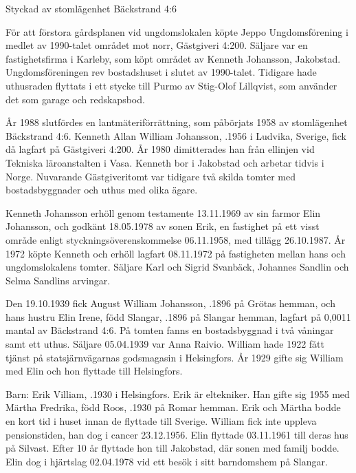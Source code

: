 Styckad av stomlägenhet Bäckstrand 4:6


%
För att förstora gårdsplanen vid ungdomslokalen köpte Jeppo	Ungdomsförening i medlet av 1990-talet området mot norr,	Gästgiveri 4:200. Säljare var en fastighetsfirma i Karleby, som köpt området av Kenneth Johansson, Jakobstad. Ungdomsföreningen	rev bostadshuset i slutet av 1990-talet. Tidigare hade uthusraden	flyttats i ett stycke till Purmo av Stig-Olof Lillqvist, som använder det som garage och redskapsbod.


%
År 1988 slutfördes en lantmäteriförrättning, som påbörjats 1958	av stomlägenhet Bäckstrand 4:6. Kenneth Allan William Johansson,	.1956 i Ludvika, Sverige, fick då lagfart på Gästgiveri 4:200.	År 1980 dimitterades han från ellinjen vid Tekniska läroanstalten i Vasa.	Kenneth bor i Jakobstad och arbetar tidvis i Norge. Nuvarande Gästgiveritomt var tidigare två skilda tomter med	bostadsbyggnader och uthus med olika ägare.

Kenneth Johansson erhöll genom testamente 13.11.1969 av sin farmor Elin Johansson, och godkänt 18.05.1978 av sonen Erik, en fastighet på ett visst område enligt styckningsöverenskommelse 06.11.1958, med tillägg 26.10.1987. År 1972 köpte Kenneth och erhöll lagfart 08.11.1972 på fastigheten mellan hans och ungdomslokalens tomter. Säljare Karl och Sigrid Svanbäck, Johannes Sandlin och Selma Sandlins arvingar.


%
Den 19.10.1939 fick August William Johansson, .1896 på	Grötas hemman, och hans hustru Elin Irene, född Slangar, .1896	på Slangar hemman, lagfart på 0,0011 mantal av Bäckstrand 4:6. På tomten fanns en bostadsbyggnad i två våningar samt ett uthus. Säljare 05.04.1939 var Anna Raivio. William hade 1922 fått tjänst på 	statsjärnvägarnas godsmagasin i Helsingfors. År 1929 gifte sig William med Elin och hon flyttade till Helsingfors.

Barn: Erik Villiam, .1930 i Helsingfors. Erik är eltekniker. Han gifte sig 1955 med 	Märtha Fredrika, född Roos, .1930 på Romar hemman. Erik och Märtha bodde en kort tid i huset innan de flyttade till Sverige. William fick inte uppleva pensionstiden, han dog i cancer 23.12.1956. Elin flyttade 03.11.1961 till deras hus på Silvast. Efter 10 år flyttade hon till Jakobstad, där sonen med familj bodde. Elin dog i hjärtslag 02.04.1978 vid ett besök i sitt barndomshem på Slangar.


